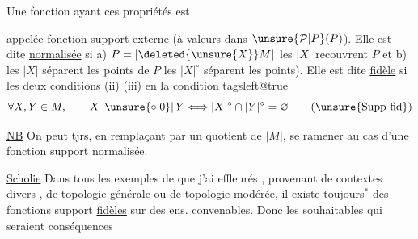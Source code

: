 Une fonction ayant ces propriétés est

appelée \uline{fonction support externe} (à valeurs dans $\unsure{\mathcal P|P}(P)$). Elle est dite \uline{normalisée} si a) $P=|\deleted{\unsure{X}}M|$  les $|X|$ recouvrent $P$ et b) les $|X|$ séparent les points de $P$  \inserted{($\Longleftrightarrow$} les $|X|^\circ$  séparent les points). Elle est dite \uline{fidèle} si les  deux conditions (ii) (iii)  en la condition
\begingroup\csname tagsleft@true\endcsname
\[
 \forall X,Y\in M,\qquad X\,|\unsure{\circ|0}|\,Y
 \Longleftrightarrow |X|^\circ\cap|Y|^\circ=\varnothing \tag*{(\unsure{Supp fid})}
\]
\endgroup

\uline{NB} On peut tjrs, en remplaçant   par un quotient de $|M|$, se ramener au cas d'une fonction support normalisée.

\uline{Scholie} Dans tous les exemples de  que j'ai effleurés , provenant de contextes divers , de topologie générale ou de topologie modérée, il existe toujours$^{*}$
des fonctions support \uline{fidèles} sur des ens. convenables. Donc les   souhaitables qui seraient conséquences

